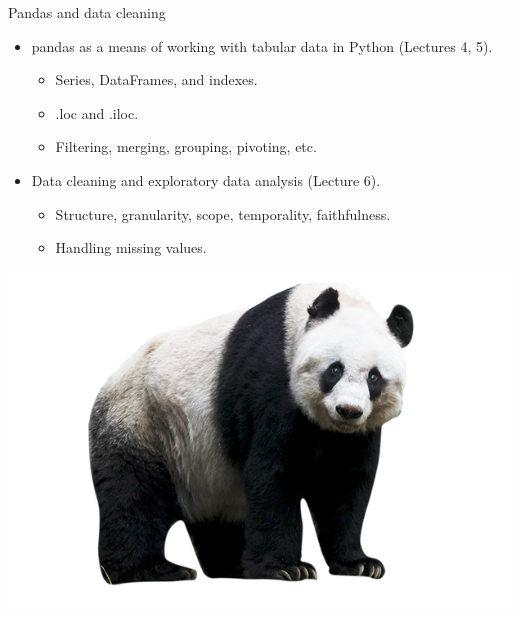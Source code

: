 \documentclass[aspectratio=169]{../latex_main/tntbeamer}  %
\begin{document}
	 
	 \begin{frame}{Pandas and data cleaning}
	     \begin{itemize}
	         \item pandas as a means of working with tabular data in Python (Lectures 4, 5).
	         \begin{itemize}
	             \item Series, DataFrames, and indexes.
	             \item .loc and .iloc.
	             \item Filtering, merging, grouping, pivoting, etc.
	         \end{itemize}
	         \item Data cleaning and exploratory data analysis (Lecture 6).
	         \begin{itemize}
	             \item Structure, granularity, scope, temporality, faithfulness.
	             \item Handling missing values.
	         \end{itemize}
	     \end{itemize}
	     \hfill
	     \includegraphics[scale=.5]{Bild2}
	 \end{frame}
	 
	 
	 
\end{document}
